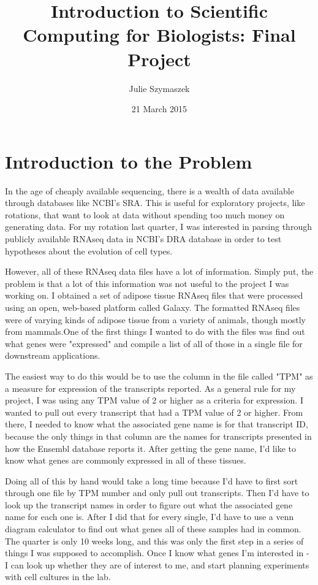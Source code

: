 \documentclass[12pt]{article}
\title{Introduction to Scientific Computing for Biologists: Final Project}
\author{Julie Szymaszek}
\date{21 March 2015}
\begin{document}
    \maketitle
    
    \section{Introduction to the Problem}
    
	In the age of cheaply available sequencing, there is a wealth of data available through databases like NCBI's SRA. This is useful for exploratory projects, like rotations, that want to look at data without spending too much money on generating data. For my rotation last quarter, I was interested in parsing through publicly available RNAseq data in NCBI's DRA database in order to test hypotheses about the evolution of cell types. 
	
	However, all of these RNAseq data files have a lot of information. Simply put, the problem is that a lot of this information was not useful to the project I was working on. I obtained a set of adipose tissue RNAseq files that were processed using an open, web-based platform called Galaxy. The formatted RNAseq files were of varying kinds of adipose tissue from a variety of animals, though mostly from mammals.One of the first things I wanted to do with the files was find out what genes were "expressed" and compile a list of all of those in a single file for downstream applications. 
	
	The easiest way to do this would be to use the column in the file called "TPM" as a measure for expression of the transcripts reported. As a general rule for my project, I was using any TPM value of 2 or higher as a criteria for expression. I wanted to pull out every transcript that had a TPM value of 2 or higher. From there, I needed to know what the associated gene name is for that transcript ID, because the only things in that column are the names for transcripts presented in how the Ensembl database reports it. After getting the gene name, I'd like to know what genes are commonly expressed in all of these tissues. 
	
	Doing all of this by hand would take a long time because I'd have to first sort through one file by TPM number and only pull out transcripts. Then I'd have to look up the transcript names in order to figure out what the associated gene name for each one is. After I did that for every single, I'd have to use a venn diagram calculator to find out what genes all of these samples had in common. The quarter is only 10 weeks long, and this was only the first step in a series of things I was supposed to accomplish. Once I know what genes I'm interested in - I can look up whether they are of interest to me, and start planning experiments with cell cultures in the lab. 
	    
\end{document}
